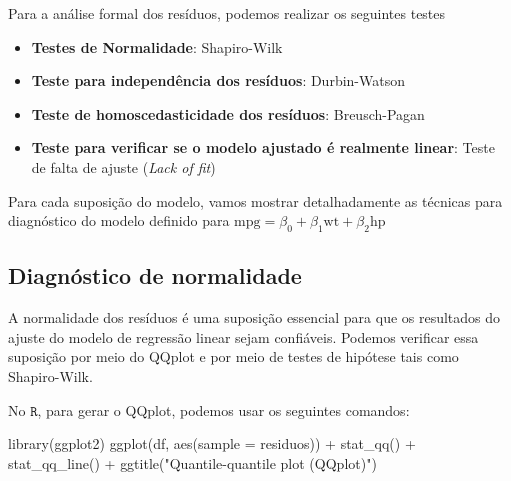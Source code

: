 \documentclass[
]{book}
\newenvironment{Shaded}{\begin{snugshade}}{\end{snugshade}}
\newcommand{\AttributeTok}[1]{\textcolor[rgb]{0.77,0.63,0.00}{#1}}
\newcommand{\FunctionTok}[1]{\textcolor[rgb]{0.00,0.00,0.00}{#1}}
\newcommand{\NormalTok}[1]{#1}
\newcommand{\OtherTok}[1]{\textcolor[rgb]{0.56,0.35,0.01}{#1}}
\newcommand{\SpecialCharTok}[1]{\textcolor[rgb]{0.00,0.00,0.00}{#1}}
\newcommand{\StringTok}[1]{\textcolor[rgb]{0.31,0.60,0.02}{#1}}
\providecommand{\tightlist}{%
  \setlength{\itemsep}{0pt}\setlength{\parskip}{0pt}}
\begin{document}
Para a análise formal dos resíduos, podemos realizar os seguintes testes

\begin{itemize}
\tightlist
\item
  \textbf{Testes de Normalidade}: Shapiro-Wilk
\item
  \textbf{Teste para independência dos resíduos}: Durbin-Watson
\item
  \textbf{Teste de homoscedasticidade dos resíduos}: Breusch-Pagan
\item
  \textbf{Teste para verificar se o modelo ajustado é realmente linear}: Teste de falta de ajuste (\emph{Lack of fit})
\end{itemize}

Para cada suposição do modelo, vamos mostrar detalhadamente as técnicas para diagnóstico do modelo definido para \(\text{mpg} = \beta_0+\beta_1\text{wt}+\beta_2\text{hp}\)

\begin{Shaded}
\end{Shaded}

\hypertarget{diagnuxf3stico-de-normalidade}{%
\subsection{Diagnóstico de normalidade}\label{diagnuxf3stico-de-normalidade}}

A normalidade dos resíduos é uma suposição essencial para que os resultados do ajuste do modelo de regressão linear sejam confiáveis. Podemos verificar essa suposição por meio do QQplot e por meio de testes de hipótese tais como Shapiro-Wilk.

No \(\texttt{R}\), para gerar o QQplot, podemos usar os seguintes comandos:

\begin{Shaded}
\begin{Highlighting}[]
\FunctionTok{library}\NormalTok{(ggplot2)}
\FunctionTok{ggplot}\NormalTok{(df, }\FunctionTok{aes}\NormalTok{(}\AttributeTok{sample =}\NormalTok{ residuos)) }\SpecialCharTok{+}
  \FunctionTok{stat\_qq}\NormalTok{() }\SpecialCharTok{+}
  \FunctionTok{stat\_qq\_line}\NormalTok{() }\SpecialCharTok{+}
  \FunctionTok{ggtitle}\NormalTok{(}\StringTok{"Quantile{-}quantile plot (QQplot)"}\NormalTok{)}
\end{Highlighting}
\end{Shaded}
\end{document}
